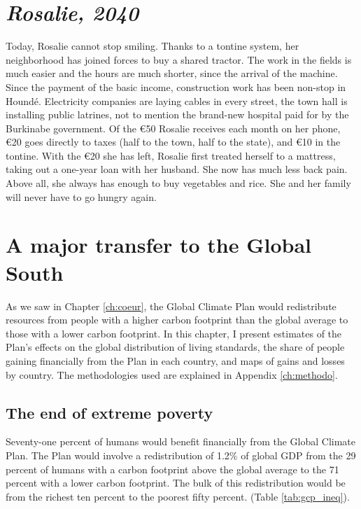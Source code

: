 \documentclass[a5paper,english,openany]{memoir}
\begin{document}
\chapter*{\textit{Rosalie, 2040}}\label{ch:narr_burkina2}
Today, Rosalie cannot stop smiling. %
Thanks to a tontine system, her neighborhood %
has joined forces to buy a shared tractor. The work in the fields is much easier %
and the hours are %
much shorter, since the arrival of the machine. Since the payment of the basic income, construction work has been non-stop in Houndé. Electricity companies are laying cables in every street, the town hall is installing public latrines, not to mention the brand-new hospital paid for by the Burkinabe government. Of the \euro{}50 Rosalie receives each month on her phone, \euro{}20 goes directly to taxes (half to the town, half to the state), and \euro{}10 %
in the tontine. With the \euro{}20 she has left, Rosalie first treated herself to a mattress, taking out a one-year loan with her husband. She now has much less back pain. Above all, she always has enough to buy vegetables and rice. She and her family will never have to go hungry again.

\chapter{A major transfer to the Global South\label{ch:effets_distributifs}}

As we saw in Chapter \ref{ch:coeur}, the Global Climate Plan would redistribute resources from people with a higher carbon footprint than the global average to those with a lower carbon footprint. In this chapter, I present estimates of the Plan's effects on the global distribution of living standards, the share of people gaining financially from the Plan in each country, and maps of gains and losses by country. The methodologies used %
are explained in Appendix \ref{ch:methodo}.

\section*{The end of extreme poverty}\label{sec:fin_pauvrete}

Seventy-one percent %
of humans would benefit financially from the Global Climate Plan. The Plan would involve a redistribution of 1.2\% of global GDP from the 29 percent %
of humans with a carbon footprint above the global average to the 71 percent with a lower carbon footprint. The bulk of this redistribution would be from the richest ten percent %
to the poorest fifty percent. %
(Table \ref{tab:gcp_ineq}). 
\end{document}
